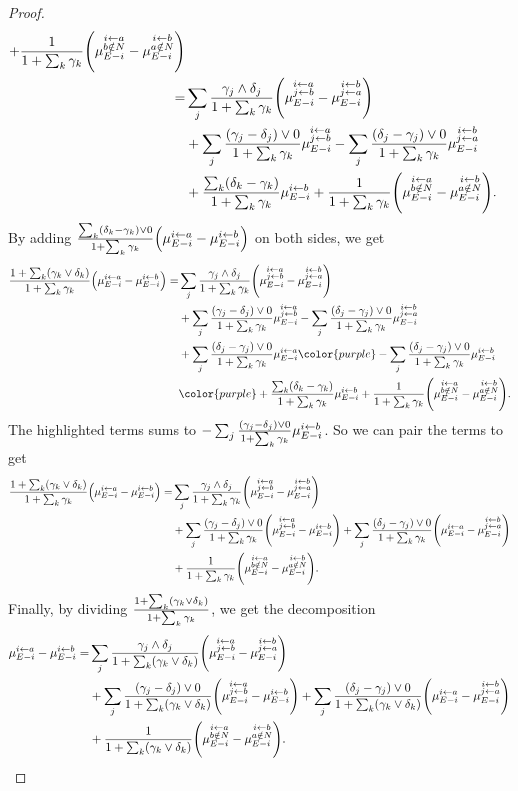 \documentclass[a4paper,11pt]{article}
\begin{document}
\begin{proof}
\begin{align*}
           +\frac{1}{ 1 + \sum_k\gamma_k}\Bigg(\man-\mbn\Bigg)
        \\=&\sj\frac{\gamma_j\wedge\delta_j}{\zz}\Bigg(\mab - \mba\Bigg)
        \\&+\sum_j\frac{(\gamma_j-\delta_j)\vee 0}{\zz}\mab
           -\sum_j\frac{(\delta_j-\gamma_j)\vee 0}{\zz}\mba
        \\&+\frac{\sum_k(\delta_k-\gamma_k)}{\zz}\mb
           +\frac{1}{\zz}\Bigg(\man-\mbn\Bigg).
    \end{align*}
    By adding $\frac{\sum_k (\delta_k-\gamma_k)\vee 0}{\zz}\Big(\ma-\mb\Big)$ on both sides, we get
    \begin{align*}
           \frac{1+\sum_k(\gamma_k\vee\delta_k)}{\zz}\Big(\ma - \mb\Big)
          =&\sj\frac{\gamma_j\wedge\delta_j}{\zz}\Bigg(\mab - \mba\Bigg)
        \\&+\sum_j\frac{(\gamma_j-\delta_j)\vee 0}{\zz}\mab
           -\sum_j\frac{(\delta_j-\gamma_j)\vee 0}{\zz}\mba
        \\&+\sj\frac{(\delta_j-\gamma_j)\vee 0}{\zz}\ma
           {\color{purple}-\sj\frac{(\delta_j-\gamma_j)\vee 0}{\zz}\mb}
        \\&{\color{purple}+\frac{\sum_k(\delta_k-\gamma_k)}{\zz}\mb}
           +\frac{1}{\zz}\Bigg(\man-\mbn\Bigg).
    \end{align*}
    The highlighted terms sums to $-\sj\frac{(\gamma_j-\delta_j)\vee 0}{\zz}\mb$.
    So we can pair the terms to get
    \begin{align*}
           \frac{1+\sum_k(\gamma_k\vee\delta_k)}{\zz}\Big(\ma - \mb\Big)
          =&\sj\frac{\gamma_j\wedge\delta_j}{\zz}\Bigg(\mab - \mba\Bigg)
        \\&+\sum_j\frac{(\gamma_j-\delta_j)\vee 0}{\zz}\Bigg(\mab-\mb\Bigg)
           +\sum_j\frac{(\delta_j-\gamma_j)\vee 0}{\zz}\Bigg(\ma-\mba\Bigg)
        \\&+\frac{1}{\zz}\Bigg(\man-\mbn\Bigg).
    \end{align*}
    Finally, by dividing $\frac{\zzz}{\zz}$, 
    we get the decomposition
    \begin{align*}
        \ma-\mb
          =&\sj\frac{\gamma_j\wedge\delta_j}{\zzz}\Bigg(\mab - \mba\Bigg)
        \\&+\sum_j\frac{(\gamma_j-\delta_j)\vee 0}{\zzz}\Bigg(\mab-\mb\Bigg)
           +\sum_j\frac{(\delta_j-\gamma_j)\vee 0}{\zzz}\Bigg(\ma-\mba\Bigg)
        \\&+\frac{1}{\zzz}\Bigg(\man-\mbn\Bigg).
    \end{align*}
\end{proof}
\end{document}
